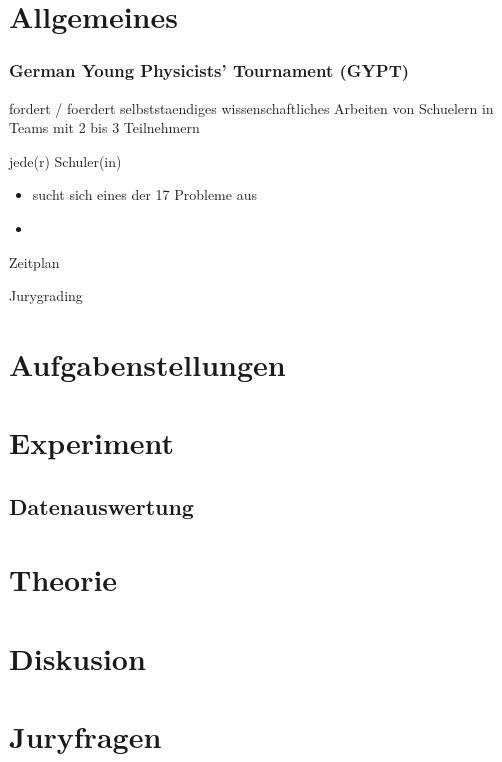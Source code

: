 \documentclass[10pt]{beamer}
\begin{document}
\section{Allgemeines}

\begin{frame}
\frametitle{German Young Physicists' Tournament (GYPT)}


 fordert / foerdert selbststaendiges \color{blue}wissenschaftliches \color{black} Arbeiten von Schuelern in Teams mit 2 bis 3 Teilnehmern

jede(r) Schuler(in)
\begin{itemize}
\item sucht sich eines der 17 Probleme aus
\item 
\end{itemize}


\end{frame}


\begin{frame}{Zeitplan}

\end{frame}

\begin{frame}{Jurygrading}
\end{frame}



\section{Aufgabenstellungen}

\section{Experiment}

\subsection{Datenauswertung}

\section{Theorie}

\section{Diskusion}

\section{Juryfragen}
\end{document}
